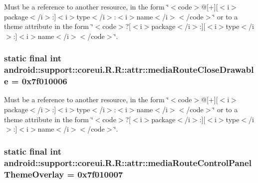 Must be a reference to another resource, in the form \char`\"{}$<$code$>$@\mbox{[}+\mbox{]}\mbox{[}$<$i$>$package$<$/i$>$:\mbox{]}$<$i$>$type$<$/i$>$:$<$i$>$name$<$/i$>$$<$/code$>$\char`\"{} or to a theme attribute in the form \char`\"{}$<$code$>$?\mbox{[}$<$i$>$package$<$/i$>$:\mbox{]}\mbox{[}$<$i$>$type$<$/i$>$:\mbox{]}$<$i$>$name$<$/i$>$$<$/code$>$\char`\"{}. \hypertarget{classandroid_1_1support_1_1coreui_1_1_r_1_1attr_64a7e3e0cbf745d46cd4ab0d98668e42}{
\subsubsection[{mediaRouteCloseDrawable}]{\setlength{\rightskip}{0pt plus 5cm}static final int android::support::coreui.R.R::attr::mediaRouteCloseDrawable = 0x7f010006}}
\label{classandroid_1_1support_1_1coreui_1_1_r_1_1attr_64a7e3e0cbf745d46cd4ab0d98668e42}


Must be a reference to another resource, in the form \char`\"{}$<$code$>$@\mbox{[}+\mbox{]}\mbox{[}$<$i$>$package$<$/i$>$:\mbox{]}$<$i$>$type$<$/i$>$:$<$i$>$name$<$/i$>$$<$/code$>$\char`\"{} or to a theme attribute in the form \char`\"{}$<$code$>$?\mbox{[}$<$i$>$package$<$/i$>$:\mbox{]}\mbox{[}$<$i$>$type$<$/i$>$:\mbox{]}$<$i$>$name$<$/i$>$$<$/code$>$\char`\"{}. \hypertarget{classandroid_1_1support_1_1coreui_1_1_r_1_1attr_3119457349597bef10f31d31e99351d4}{
\subsubsection[{mediaRouteControlPanelThemeOverlay}]{\setlength{\rightskip}{0pt plus 5cm}static final int android::support::coreui.R.R::attr::mediaRouteControlPanelThemeOverlay = 0x7f010007}}
\label{classandroid_1_1support_1_1coreui_1_1_r_1_1attr_3119457349597bef10f31d31e99351d4}


